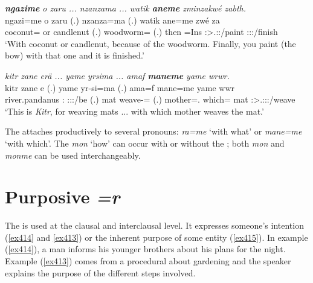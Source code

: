 \begin{exe}
	\ex \emph{\textbf{ngazime} o zaru ... nzanzama ... watik \textbf{aneme} zminzakwé zabth.}\\
	\gll ngazi=me o zaru (.) nzanza=ma (.) watik ane=me zwé za\\
	coconut={\Ins} or candlenut (.) woodworm={\Char} (.) then \Dem=Ins{} \Ssg:\Sbj>\Tsg.\F:\Imp:\Ipfv/paint \Stsg:\Sbj:\Rpst:\Pfv/finish\\
	\trans `With coconut or candlenut, because of the woodworm. Finally, you paint (the bow) with that one and it is finished.'
	\label{ex410}
\end{exe}
\begin{exe}
	\ex \emph{kitr zane erä ... yame yrsima ... amaf \textbf{maneme} yame wrwr.}\\
	\gll kitr zane e (.) yame yr-si=ma (.) ama=f mane=me yame wwr\\
	river.pandanus \Dem:{\Prox} \Stpl:\Sbj:\Nonpast:\Ipfv/be (.) mat weave-\Nmlz={\Char} (.) mother=\Erg.{\Sg} which={\Ins} mat \Stsg:\Sbj>\Tsg.\F:\Obj:\Nonpast:\Ipfv/weave\\ 
	\trans `This is \emph{Kitr}, for weaving mats ... with which mother weaves the mat.'\\
	\label{ex411}
\end{exe}

The  attaches productively to several  pronouns: \emph{ra=me} `with what' or \emph{mane=me} `with which'. The  \emph{mon} `how' can occur with or without the  ; both \emph{mon} and \emph{monme} can be used interchangeably.

\section{Purposive \emph{=r}} \label{purpcase}

The   is used at the clausal and interclausal level. It expresses someone's intention (\ref{ex414} and \ref{ex413}) or the inherent purpose of some entity (\ref{ex415}). In example (\ref{ex414}), a man informs his younger brothers about his plans for the night. Example (\ref{ex413}) comes from a procedural about gardening and the speaker explains the purpose of the different steps involved.

